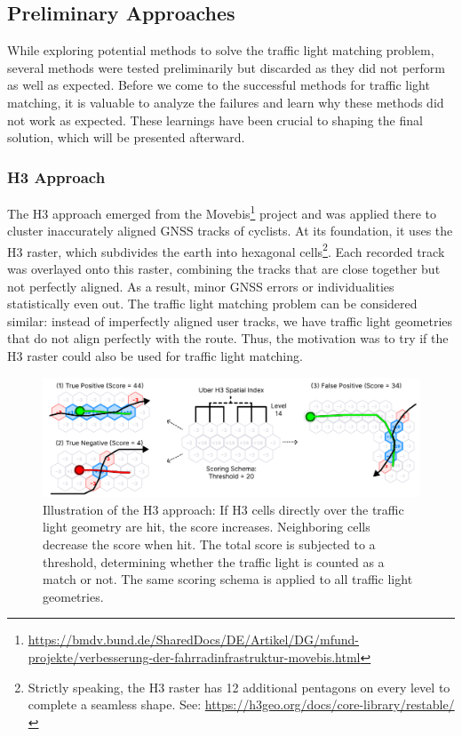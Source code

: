 \subsection{Preliminary Approaches}

While exploring potential methods to solve the traffic light matching problem, several methods were tested preliminarily but discarded as they did not perform as well as expected. Before we come to the successful methods for traffic light matching, it is valuable to analyze the failures and learn why these methods did not work as expected. These learnings have been crucial to shaping the final solution, which will be presented afterward.

\subsubsection{H3 Approach}

The H3 approach emerged from the Movebis\footnote{\url{https://bmdv.bund.de/SharedDocs/DE/Artikel/DG/mfund-projekte/verbesserung-der-fahrradinfrastruktur-movebis.html}} project and was applied there to cluster inaccurately aligned GNSS tracks of cyclists. At its foundation, it uses the H3 raster, which subdivides the earth into hexagonal cells\footnote{Strictly speaking, the H3 raster has 12 additional pentagons on every level to complete a seamless shape. See: \url{https://h3geo.org/docs/core-library/restable/}}. Each recorded track was overlayed onto this raster, combining the tracks that are close together but not perfectly aligned. As a result, minor GNSS errors or individualities statistically even out. The traffic light matching problem can be considered similar: instead of imperfectly aligned user tracks, we have traffic light geometries that do not align perfectly with the route. Thus, the motivation was to try if the H3 raster could also be used for traffic light matching.

\begin{figure}[t]
\centering
\includegraphics[width=\linewidth]{images/sg-selection-h3-approach.pdf}
\caption{Illustration of the H3 approach: If H3 cells directly over the traffic light geometry are hit, the score increases. Neighboring cells decrease the score when hit. The total score is subjected to a threshold, determining whether the traffic light is counted as a match or not. The same scoring schema is applied to all traffic light geometries.}
\label{fig:sg-selection-h3-approach}
\end{figure}

